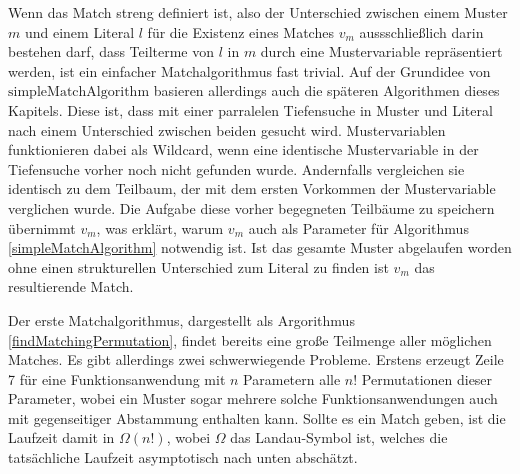 Wenn das Match streng definiert ist, also der Unterschied zwischen einem Muster $m$ und einem Literal $l$ für die Existenz eines Matches $v_m$ aussschließlich darin bestehen darf, dass Teilterme von $l$ in $m$ durch eine Mustervariable repräsentiert werden, ist ein einfacher Matchalgorithmus fast trivial. Auf der Grundidee von $\mathrm{simpleMatchAlgorithm}$ basieren allerdings auch die späteren Algorithmen dieses Kapitels. Diese ist, dass mit einer parralelen Tiefensuche in Muster und Literal nach einem Unterschied zwischen beiden gesucht wird. Mustervariablen funktionieren dabei als Wildcard, wenn eine identische Mustervariable in der Tiefensuche vorher noch nicht gefunden wurde. Andernfalls vergleichen sie identisch zu dem Teilbaum, der mit dem ersten Vorkommen der Mustervariable verglichen wurde. Die Aufgabe diese vorher begegneten Teilbäume zu speichern übernimmt $v_m$, was erklärt, warum $v_m$ auch als Parameter für Algorithmus \ref{simpleMatchAlgorithm} notwendig ist. Ist das gesamte Muster abgelaufen worden ohne einen strukturellen Unterschied zum Literal zu finden ist $v_m$ das resultierende Match.\\


Der erste Matchalgorithmus, dargestellt als Argorithmus \ref{findMatchingPermutation}, findet bereits eine große Teilmenge aller möglichen Matches. Es gibt allerdings zwei schwerwiegende Probleme. Erstens erzeugt Zeile 7 für eine Funktionsanwendung mit $n$ Parametern alle $n!$ Permutationen dieser Parameter, wobei ein Muster sogar mehrere solche Funktionsanwendungen auch mit gegenseitiger Abstammung enthalten kann. Sollte es ein Match geben, ist die Laufzeit damit in $\Omega(n!)$, wobei  $\Omega$ das Landau-Symbol ist, welches die tatsächliche Laufzeit asymptotisch nach unten abschätzt.

